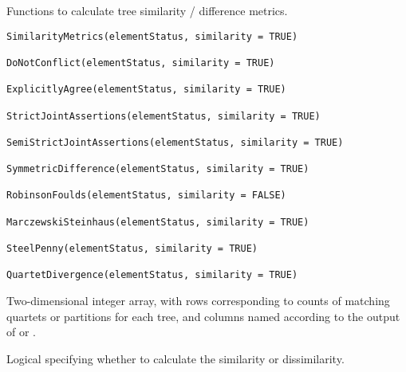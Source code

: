 \documentclass[a4paper]{book}
\begin{document}
%
\begin{Description}\relax
Functions to calculate tree similarity / difference metrics.
\end{Description}
%
\begin{Usage}
\begin{verbatim}
SimilarityMetrics(elementStatus, similarity = TRUE)

DoNotConflict(elementStatus, similarity = TRUE)

ExplicitlyAgree(elementStatus, similarity = TRUE)

StrictJointAssertions(elementStatus, similarity = TRUE)

SemiStrictJointAssertions(elementStatus, similarity = TRUE)

SymmetricDifference(elementStatus, similarity = TRUE)

RobinsonFoulds(elementStatus, similarity = FALSE)

MarczewskiSteinhaus(elementStatus, similarity = TRUE)

SteelPenny(elementStatus, similarity = TRUE)

QuartetDivergence(elementStatus, similarity = TRUE)
\end{verbatim}
\end{Usage}
%
\begin{Arguments}
\begin{ldescription}
\item[\code{elementStatus}] Two-dimensional integer array, with rows corresponding to
counts of matching quartets or partitions for each tree, and columns named
according to the output of  or .

\item[\code{similarity}] Logical specifying whether to calculate the similarity
or dissimilarity.
\end{ldescription}
\end{Arguments}
%
\end{document}
